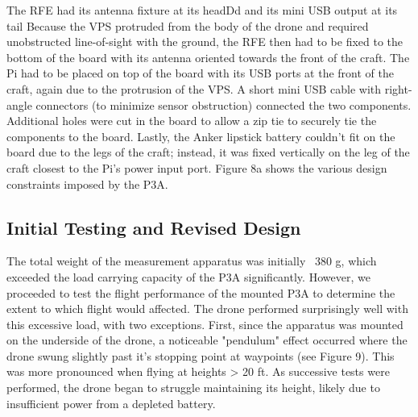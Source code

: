 \documentclass[pageno]{jpaper}
\begin{document}
 The RFE had its antenna fixture at its headDd and its mini USB output at its tail  Because the VPS protruded from the body of the drone and required unobstructed line-of-sight with the ground, the RFE then had to be fixed to the bottom of the board with its antenna oriented towards the front of the craft. The Pi had to be placed on top of the board with its USB ports at the front of the craft, again due to the protrusion of the VPS. A short mini USB cable with right-angle connectors (to minimize sensor obstruction) connected the two components. Additional holes were cut in the board to allow a zip tie to securely tie the components to the board. Lastly, the Anker lipstick battery couldn't fit on the board due to the legs of the craft; instead, it was fixed vertically on the leg of the craft closest to the Pi's power input port. Figure 8a shows the various design constraints imposed by the P3A.
 
 \subsection{Initial Testing and Revised Design}
 The total weight of the measurement apparatus was initially ~380 g, which exceeded the load carrying capacity of the P3A significantly. However, we proceeded to test the flight performance of the mounted P3A to determine the extent to which flight would affected. The drone performed surprisingly well with  this excessive load, with two exceptions. First, since the apparatus was mounted on the underside of the drone, a noticeable "pendulum" effect occurred where the drone swung slightly past it's stopping point at waypoints (see Figure 9). This was more pronounced when flying at heights > 20 ft. As successive tests were performed, the drone began to struggle maintaining its height, likely due to insufficient power from a depleted battery. 
 
\end{document}
